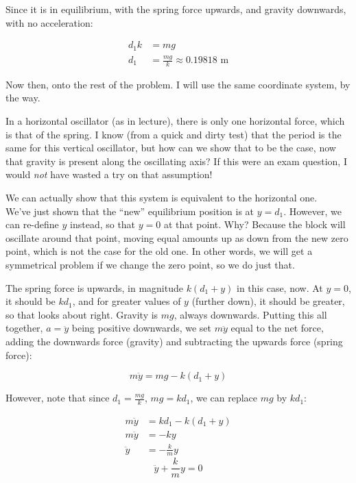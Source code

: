 \documentclass[12pt,a4paper]{report}
\begin{document}
Since it is in equilibrium, with the spring force upwards, and gravity downwards, with no acceleration:

\begin{align}
d_1 k &= m g\\
d_1 &= \frac{m g}{k} \approx 0.19818 \text{ m}
\end{align}

Now then, onto the rest of the problem. I will use the same coordinate system, by the way.

In a horizontal oscillator (as in lecture), there is only one horizontal force, which is that of the spring. I know (from a quick and dirty test) that the period is the same for this vertical oscillator, but how can we show that to be the case, now that gravity is present along the oscillating axis? If this were an exam question, I would \emph{not} have wasted a try on that assumption!

We can actually show that this system is equivalent to the horizontal one.\\
We've just shown that the ``new'' equilibrium position is at $y = d_1$. However, we can re-define $y$ instead, so that $y = 0$ at that point. Why? Because the block will oscillate around that point, moving equal amounts up as down from the new zero point, which is not the case for the old one. In other words, we will get a symmetrical problem if we change the zero point, so we do just that.

The spring force is upwards, in magnitude $k (d_1 + y)$ in this case, now. At $y = 0$, it should be $k d_1$, and for greater values of $y$ (further down), it should be greater, so that looks about right. Gravity is $m g$, always downwards. Putting this all together, $a = \ddot{y}$ being positive downwards, we set $m \ddot{y}$ equal to the net force, adding the downwards force (gravity) and subtracting the upwards force (spring force):

\begin{equation}
m \ddot{y} = m g - k(d_1 + y)
\end{equation}

However, note that since $d_1 = \frac{m g}{k}$, $m g = k d_1$, we can replace $m g$ by $k d_1$:

\begin{align}
m \ddot{y} &= k d_1 - k(d_1 + y)\\
m \ddot{y} &= - k y\\
\ddot{y} &= - \frac{k}{m} y
\end{align}
\begin{equation}
\ddot{y} + \frac{k}{m} y = 0
\end{equation}
\end{document}

